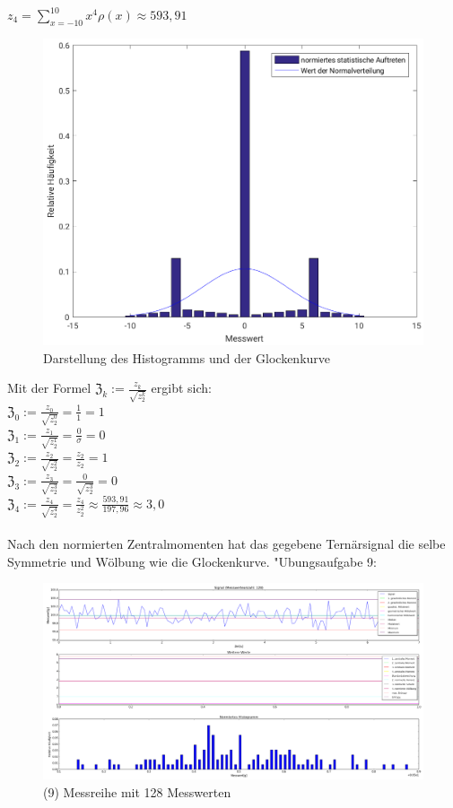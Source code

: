 \documentclass[fleqn,a4paper,12pt]{article}
\begin{document}
	$z_4 = \sum_{x=-10}^{10} x^4\rho(x) \approx  593,91$\\
	\newpage
	\begin{figure}
		\includegraphics[scale = 0.9]{A8_Histogramm.png}
		\caption{Darstellung des Histogramms und der Glockenkurve}
	\end{figure}
	Mit der Formel $\mathfrak{Z}_k := \frac{z_k}{\sqrt{z_2^k}}$ ergibt sich:\\
	$\mathfrak{Z}_0 := \frac{z_0}{\sqrt{z_2^0}} = \frac{1}{1} = 1$\\
	$\mathfrak{Z}_1 := \frac{z_1}{\sqrt{z_2^1}} = \frac{0}{\sigma} = 0$\\
	$\mathfrak{Z}_2 := \frac{z_2}{\sqrt{z_2^2}} = \frac{z_2}{z_2} = 1$\\
	$\mathfrak{Z}_3 := \frac{z_3}{\sqrt{z_2^3}} = \frac{0}{\sqrt{z_2^3}} = 0$\\
	$\mathfrak{Z}_4 := \frac{z_4}{\sqrt{z_2^4}} = \frac{z_4}{z_2^2} \approx \frac{593,91}{197,96} \approx 3,0$\\
	\\
	Nach den normierten Zentralmomenten hat das gegebene Ternärsignal die selbe Symmetrie und Wölbung wie die Glockenkurve.
  \newpage
  "Ubungsaufgabe 9: \newline
  \begin{figure}
      \includegraphics[width=1.0\textwidth]{a9_128.png}
      \caption{(9) Messreihe mit 128 Messwerten}
  \end{figure}
\end{document}
